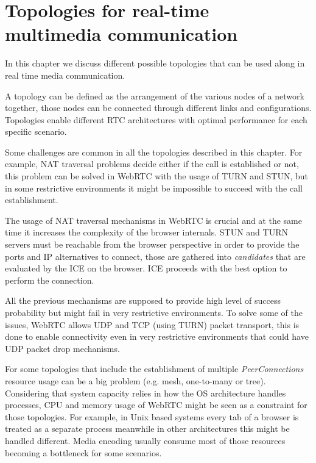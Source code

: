 \section{Topologies for real-time multimedia communication}
\label{sec:topologies}


\thispagestyle{empty}

In this chapter we discuss different possible topologies that can be used along in real time media communication.

A topology can be defined as the arrangement of the various nodes of a network together, those nodes can be connected through different links and configurations. Topologies enable different RTC architectures with optimal performance for each specific scenario. 


Some challenges are common in all the topologies described in this chapter. For example, NAT traversal problems decide either if the call is established or not, this problem can be solved in WebRTC with the usage of TURN and STUN, but in some restrictive environments it might be impossible to succeed with the call establishment. 

The usage of NAT traversal mechanisms in WebRTC is crucial and at the same time it increases the complexity of the browser internals. STUN and TURN servers must be reachable from the browser perspective in order to provide the ports and IP alternatives to connect, those are gathered into {\it candidates} that are evaluated by the ICE on the browser. ICE proceeds with the best option to perform the connection. 

All the previous mechanisms are supposed to provide high level of success probability but might fail in very restrictive environments. To solve some of the issues, WebRTC allows UDP and TCP (using TURN) packet transport, this is done to enable connectivity even in very restrictive environments that could have UDP packet drop mechanisms. 

For some topologies that include the establishment of multiple {\it PeerConnections} resource usage can be a big problem (e.g. mesh, one-to-many or tree). Considering that system capacity relies in how the OS architecture handles processes, CPU and memory usage of WebRTC might be seen as a constraint for those topologies. For example, in Unix based systems every tab of a browser is treated as a separate process meanwhile in other architectures this might be handled different. Media encoding usually consume most of those resources becoming a bottleneck for some scenarios.

